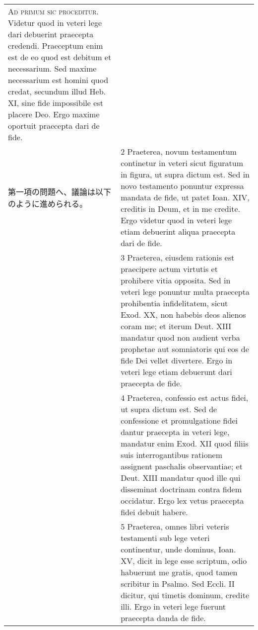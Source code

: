 \documentclass[10pt]{jsarticle} %
\begin{document}
\begin{longtable}{p{21em}p{21em}}
{\huge A}{\scshape d primum sic proceditur}. Videtur
quod in veteri lege dari debuerint praecepta credendi. Praeceptum enim
est de eo quod est debitum et necessarium. Sed maxime necessarium est
homini quod credat, secundum illud Heb. XI, sine fide impossibile est
placere Deo. Ergo maxime oportuit praecepta dari de fide.

\\

第一項の問題へ、議論は以下のように進められる。

&



2 Praeterea, novum testamentum
continetur in veteri sicut figuratum in figura, ut supra dictum est. Sed
in novo testamento ponuntur expressa mandata de fide, ut patet
Ioan. XIV, creditis in Deum, et in me credite. Ergo videtur quod in
veteri lege etiam debuerint aliqua praecepta dari de fide.


\\

&



3 Praeterea, eiusdem rationis est
praecipere actum virtutis et prohibere vitia opposita. Sed in veteri
lege ponuntur multa praecepta prohibentia infidelitatem, sicut Exod. XX,
non habebis deos alienos coram me; et iterum Deut. XIII mandatur quod
non audient verba prophetae aut somniatoris qui eos de fide Dei vellet
divertere. Ergo in veteri lege etiam debuerunt dari praecepta de fide.


\\

&



4 Praeterea, confessio est actus fidei,
ut supra dictum est. Sed de confessione et promulgatione fidei dantur
praecepta in veteri lege, mandatur enim Exod. XII quod filiis suis
interrogantibus rationem assignent paschalis observantiae; et Deut. XIII
mandatur quod ille qui disseminat doctrinam contra fidem occidatur. Ergo
lex vetus praecepta fidei debuit habere.


\\

&



5 Praeterea, omnes libri veteris
testamenti sub lege veteri continentur, unde dominus, Ioan. XV, dicit in
lege esse scriptum, odio habuerunt me gratis, quod tamen scribitur in
Psalmo. Sed Eccli. II dicitur, qui timetis dominum, credite illi. Ergo
in veteri lege fuerunt praecepta danda de fide.



\end{longtable}
\end{document}
